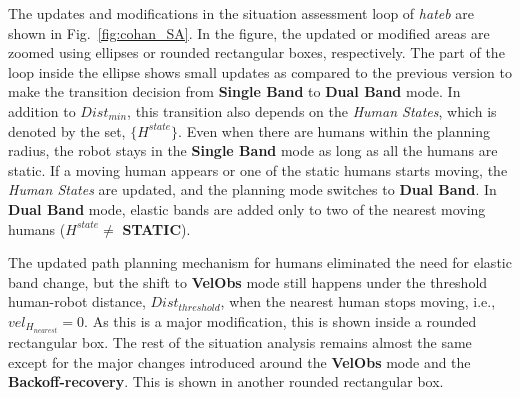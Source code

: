 The updates and modifications in the situation assessment loop of \textit{\acrshort{hateb}} are shown in Fig.~\ref{fig:cohan_SA}. In the figure, the updated or modified areas are zoomed using ellipses or rounded rectangular boxes, respectively. The part of the loop inside the ellipse shows small updates as compared to the previous version to make the transition decision from \textbf{Single Band} to \textbf{Dual Band} mode. In addition to $Dist_{min}$, this transition also depends on the \textit{Human States}, which is denoted by the set, $\{H^{state}\}$. Even when there are humans within the planning radius, the robot stays in the \textbf{Single Band} mode as long as all the humans are static. If a moving human appears or one of the static humans starts moving, the \textit{Human States} are updated, and the planning mode switches to \textbf{Dual Band}. In \textbf{Dual Band} mode, elastic bands are added only to two of the nearest moving humans ($H^{state} \neq $ \textbf{STATIC}). 

The updated path planning mechanism for humans eliminated the need for elastic band change, but the shift to \textbf{VelObs} mode still happens under the threshold human-robot distance, $Dist_{threshold}$, when the nearest human stops moving, i.e., $vel_{H_{nearest}} = 0$. As this is a major modification, this is shown inside a rounded rectangular box. The rest of the situation analysis remains almost the same except for the major changes introduced around the \textbf{VelObs} mode and the \textbf{Backoff-recovery}. This is shown in another rounded rectangular box.

